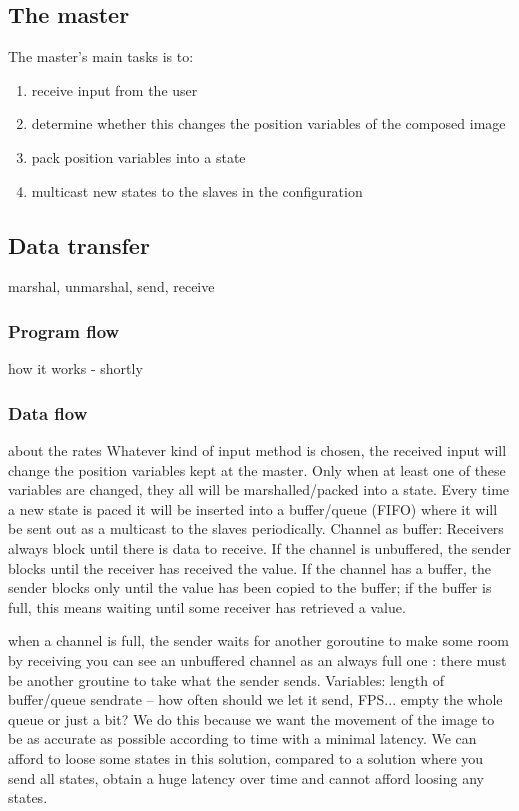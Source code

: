 \documentclass[12pt, a4paper, oneside]{article}
\begin{document}
\subsection{The master}
The master's main tasks is to:
\begin{enumerate}
\item receive input from the user
\item determine whether this changes the position variables of the composed image
\item pack position variables into a state
\item multicast new states to the slaves in the configuration
\end{enumerate}



\subsection{Data transfer}
marshal, unmarshal, send, receive
\subsubsection{Program flow}
how it works  - shortly
\subsubsection{Data flow}
about the rates\newline
Whatever kind of input method is chosen, the received input will change the position variables kept at the master. Only when at least one of these variables are changed, they all will be marshalled/packed into a state. Every time a new state is paced it will be inserted into a buffer/queue (FIFO)  where it will be sent out as a multicast to the slaves periodically.
\newline
\newline
Channel as buffer:
Receivers always block until there is data to receive. If the channel is unbuffered, the sender blocks until the receiver has received the value. If the channel has a buffer, the sender blocks only until the value has been copied to the buffer; if the buffer is full, this means waiting until some receiver has retrieved a value.

when a channel is full, the sender waits for another goroutine to make some room by receiving
you can see an unbuffered channel as an always full one : there must be another groutine to take what the sender sends.
\newline
\newline
Variables:
length of buffer/queue
sendrate – how often should we let it send, FPS...
empty the whole queue or just a bit?
\newline
\newline
We do this because we want the movement of the image to be as accurate as possible according to time with a minimal latency. 
We can afford to loose some states in this solution, compared to a solution where you send all states, obtain a huge latency over time and cannot afford loosing any states.
\end{document}
